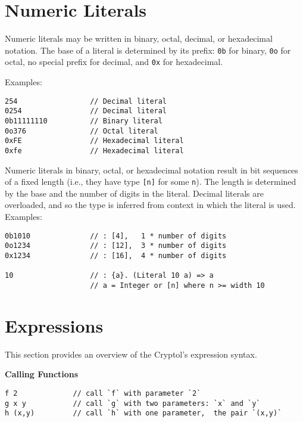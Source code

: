 \hypertarget{numeric-literals}{%
\section{Numeric Literals}\label{numeric-literals}}

Numeric literals may be written in binary, octal, decimal, or
hexadecimal notation. The base of a literal is determined by its prefix:
\texttt{0b} for binary, \texttt{0o} for octal, no special prefix for
decimal, and \texttt{0x} for hexadecimal.

Examples:

\begin{verbatim}
254                 // Decimal literal
0254                // Decimal literal
0b11111110          // Binary literal
0o376               // Octal literal
0xFE                // Hexadecimal literal
0xfe                // Hexadecimal literal
\end{verbatim}

Numeric literals in binary, octal, or hexadecimal notation result in bit
sequences of a fixed length (i.e., they have type \texttt{{[}n{]}} for
some \texttt{n}). The length is determined by the base and the number of
digits in the literal. Decimal literals are overloaded, and so the type
is inferred from context in which the literal is used. Examples:

\begin{verbatim}
0b1010              // : [4],   1 * number of digits
0o1234              // : [12],  3 * number of digits
0x1234              // : [16],  4 * number of digits

10                  // : {a}. (Literal 10 a) => a
                    // a = Integer or [n] where n >= width 10
\end{verbatim}

\hypertarget{expressions}{%
\section{Expressions}\label{expressions}}

This section provides an overview of the Cryptol's expression syntax.

\textbf{Calling Functions}

\begin{verbatim}
f 2             // call `f` with parameter `2`
g x y           // call `g` with two parameters: `x` and `y`
h (x,y)         // call `h` with one parameter,  the pair `(x,y)`
\end{verbatim}


